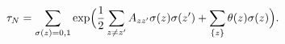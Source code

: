\begin{equation}
\tau_N=\sum_{\sigma(z)=0,1}\exp\Bigl(\frac{1}{2}\sum_{z\neq z^\prime}A_{z
z^\prime}\sigma(z)\sigma(z^\prime)+\sum_{\{z\}}
\theta(z)\sigma(z)\Bigr).
\label{tau}\end{equation}

